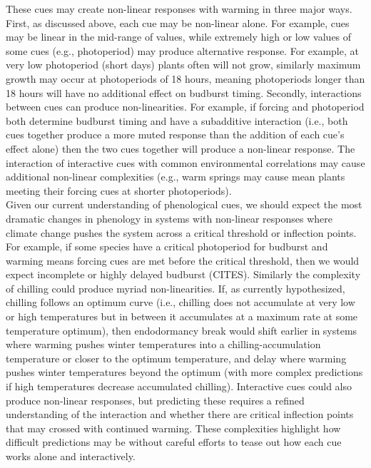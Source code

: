 \documentclass[11pt,letter]{article}
\begin{document}
These cues may create non-linear responses with warming in three major ways. First, as discussed above, each cue may be non-linear alone. For example, cues may be linear in the mid-range of values, while extremely high or low values of some cues (e.g., photoperiod) may produce alternative response. For example, at very low photoperiod (short days) plants often will not grow, similarly maximum growth may occur at photoperiods of 18 hours, meaning photoperiods longer than 18 hours will have no additional effect on budburst timing.  %
Secondly, interactions between cues can produce non-linearities. For example, if forcing and photoperiod both determine budburst timing and have a subadditive interaction (i.e., both cues together produce a more muted response than the addition of each cue's effect alone) then the two cues together will produce a non-linear response. The interaction of interactive cues with common environmental correlations may cause additional non-linear complexities (e.g., warm springs may cause mean plants meeting their forcing cues at shorter photoperiods). \\

Given our current understanding of phenological cues, we should expect the most dramatic changes in phenology in systems with non-linear responses where climate change pushes the system across a critical threshold or inflection points. For example, if some species have a critical photoperiod for budburst and warming means forcing cues are met before the critical threshold, then we would expect incomplete or highly delayed budburst (CITES). Similarly the complexity of chilling could produce myriad non-linearities. If, as currently hypothesized, chilling follows an optimum curve (i.e., chilling does not accumulate at very low or high temperatures but in between it accumulates at a maximum rate at some temperature optimum), then endodormancy break would shift earlier in systems where warming pushes winter temperatures into a chilling-accumulation temperature or closer to the optimum temperature, and delay where warming pushes winter temperatures beyond the optimum (with more complex predictions if high temperatures decrease accumulated chilling). Interactive cues could also produce non-linear responses, but predicting these requires a refined understanding of the interaction and whether there are critical inflection points that may crossed with continued warming. These complexities highlight how difficult predictions may be without careful efforts to tease out how each cue works alone and interactively. 
\end{document}

